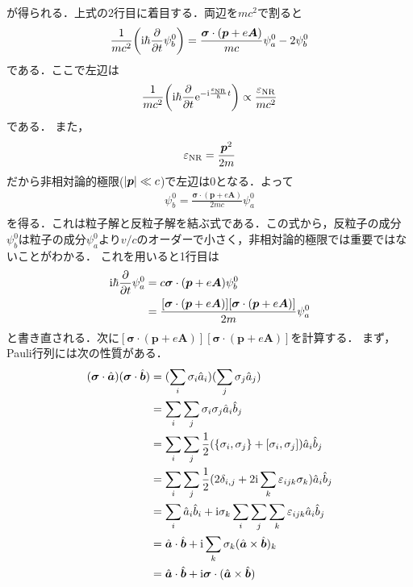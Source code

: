 \documentclass{report}
\begin{document}
が得られる．上式の2行目に着目する．両辺を$mc^2$で割ると
\begin{align}
  \frac{1}{mc^2}\qty(\mathrm{i}\hbar\frac{\partial}{\partial t}\psi_b^0) = \frac{\bm{\sigma}\cdot(\bm{p} + e\bm{A})}{mc}\psi^0_a - 2 \psi^0_b
\end{align}
である．ここで左辺は
\begin{align}
  \frac{1}{mc^2}\qty(\mathrm{i}\hbar\frac{\partial}{\partial t}\mathrm{e}^{-\mathrm{i}\frac{\varepsilon_{\mathrm{NR}}}{\hbar} t}) \propto \frac{\varepsilon_{\mathrm{NR}}}{mc^2}
\end{align}
である．
また，
\begin{align}
  \varepsilon_{\mathrm{NR}} = \frac{\bm{p}^2}{2m}
\end{align}
だから非相対論的極限($\abs{\bm{p}} \ll c$)で左辺は0となる．よって
\begin{align}
  \psi_b^0 = \frac{\bm{\sigma}\cdot(\bm{p} + e\bm{A})}{2mc}\psi^0_a\\
\end{align}
を得る．これは粒子解と反粒子解を結ぶ式である．この式から，反粒子の成分$\psi^0_b$は粒子の成分$\psi^0_a$より$v/c$のオーダーで小さく，非相対論的極限では重要ではないことがわかる．
これを用いると1行目は
\begin{align}
  \mathrm{i}\hbar\frac{\partial}{\partial t}\psi^0_a &= c\bm{\sigma} \cdot (\bm{p} + e\bm{A})\psi_b^0\\
  &= \frac{[\bm{\sigma}\cdot(\bm{p} + e\bm{A})][\bm{\sigma}\cdot(\bm{p} + e\bm{A})]}{2m}\psi^0_a
\end{align}
と書き直される．次に$[\bm{\sigma}\cdot(\bm{p} + e\bm{A})][\bm{\sigma}\cdot(\bm{p} + e\bm{A})]$を計算する．
まず，Pauli行列には次の性質がある．
\begin{align}
  (\bm{\sigma}\cdot\hat{\bm{a}})(\bm{\sigma}\cdot\hat{\bm{b}}) &= (\sum_{i} \sigma_i \hat{a}_i) (\sum_{j} \sigma_j \hat{a}_j)\\
  &= \sum_{i} \sum_{j} \sigma_{i} \sigma_{j} \hat{a}_i \hat{b}_j\\
  &= \sum_{i} \sum_{j} \frac{1}{2}(\qty{\sigma_i, \sigma_j} + [\sigma_i, \sigma_j]) \hat{a}_i \hat{b}_j\\
  &= \sum_{i} \sum_{j} \frac{1}{2}(2 \delta_{i,j} + 2\mathrm{i} \sum_{k} \varepsilon_{ijk} \sigma_k) \hat{a}_i \hat{b}_j\\
  &= \sum_{i} \hat{a}_i \hat{b}_i + \mathrm{i} \sigma_k \sum_{i} \sum_{j} \sum_{k} \varepsilon_{ijk} \hat{a}_i \hat{b}_j\\
  &= \hat{\bm{a}}\cdot\hat{\bm{b}} + \mathrm{i} \sum_{k} \sigma_k (\hat{\bm{a}} \times \hat{\bm{b}})_k\\
  &= \hat{\bm{a}}\cdot\hat{\bm{b}} + \mathrm{i} \bm{\sigma} \cdot (\hat{\bm{a}} \times \hat{\bm{b}}) \label{pauli-inner-product}
\end{align}
\end{document}
